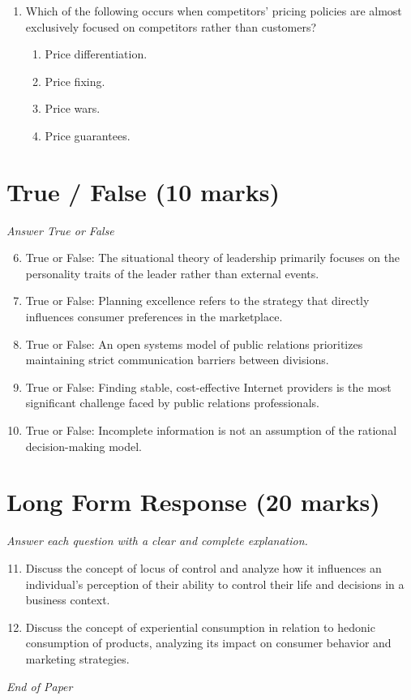 \documentclass[12pt]{article}
\begin{document}
\begin{enumerate}[label=\arabic*.]
\begin{enumerate}[label=(\alph*)]
    \item Retailers.
\end{enumerate}
\item Which of the following occurs when competitors' pricing policies are almost exclusively focused on competitors rather than customers?
\begin{enumerate}[label=(\alph*)]
    \item Price differentiation.
    \item Price fixing.
    \item Price wars.
    \item Price guarantees.
\end{enumerate}
\end{enumerate}

\section*{True / False (10 marks)}
\textit{Answer True or False}
\begin{enumerate}[label=\arabic*.]
\setcounter{enumi}{5}
\item True or False: The situational theory of leadership primarily focuses on the personality traits of the leader rather than external events.
\item True or False: Planning excellence refers to the strategy that directly influences consumer preferences in the marketplace.
\item True or False: An open systems model of public relations prioritizes maintaining strict communication barriers between divisions.
\item True or False: Finding stable, cost-effective Internet providers is the most significant challenge faced by public relations professionals.
\item True or False: Incomplete information is not an assumption of the rational decision-making model.
\end{enumerate}

\section*{Long Form Response (20 marks)}
\textit{Answer each question with a clear and complete explanation.}
\begin{enumerate}[label=\arabic*.]
\setcounter{enumi}{10}
\item Discuss the concept of locus of control and analyze how it influences an individual's perception of their ability to control their life and decisions in a business context.
\item Discuss the concept of experiential consumption in relation to hedonic consumption of products, analyzing its impact on consumer behavior and marketing strategies.
\end{enumerate}

\vfill
\noindent\textit{End of Paper}
\end{document}
